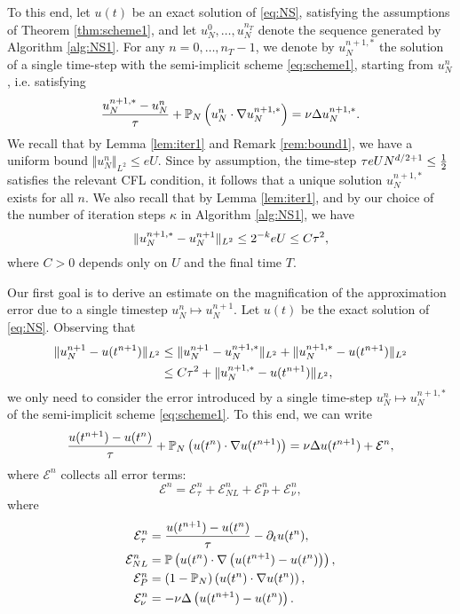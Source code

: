 \documentclass[reqno,a4paper]{amsart}
\begin{document}
To this end, let $u(t)$ be an exact solution of \eqref{eq:NS}, satisfying the assumptions of Theorem \ref{thm:scheme1}, and let $u^0_N, \dots, u^{n_T}_N$ denote the sequence generated by Algorithm \ref{alg:NS1}. For any $n=0,\dots, n_T-1$, we denote by $u^{n+1,\ast}_N$ the solution of a single time-step with the semi-implicit scheme \eqref{eq:scheme1}, starting from $u^{n}_N$, i.e. satisfying
\begin{align} \label{eq:scheme-ast1}
\frac{u^{n+1,\ast}_N-u^n_N}{{\tau}}
+
\mathbb{P}_N\left(
u^n_N \cdot \nabla u^{n+1,\ast}_N
\right)
=
\nu \Delta u^{n+1,\ast}_N.
\end{align}
We recall that by Lemma \ref{lem:iter1} and Remark \ref{rem:bound1}, we have a uniform bound $\Vert u^n_N \Vert_{L^2}\le eU$. Since by assumption, the time-step ${\tau} e U N^{d/2+1}\le \frac1{2}$ satisfies the relevant CFL condition, it follows that a unique solution $u^{n+1,\ast}_N$ exists for all $n$. We also recall that by Lemma \ref{lem:iter1}, and by our choice of the number of iteration steps $\kappa$ in Algorithm \ref{alg:NS1}, we have
\[
\Vert u^{n+1,\ast}_N - u^{n+1}_N \Vert_{L^2}
\le
2^{-k} eU
\le
C {\tau}^2,
\]
where $C>0$ depends only on $U$ and the final time $T$. 

Our first goal is to derive an estimate on the magnification of the approximation error due to a single timestep $u^n_N \mapsto u^{n+1}_N$. Let $u(t)$ be the exact solution of \eqref{eq:NS}. Observing that 
\begin{align} \label{eq:single-dt}
\begin{aligned}
\Vert u^{n+1}_N - u(t^{n+1}) \Vert_{L^2}
&\le
\Vert u^{n+1}_N - u^{n+1,\ast}_N \Vert_{L^2} + \Vert u^{n+1,\ast}_N - u(t^{n+1}) \Vert_{L^2}
\\
&\le
C {\tau}^2 + \Vert u^{n+1,\ast}_N - u(t^{n+1}) \Vert_{L^2},
\end{aligned}
\end{align}
we only need to consider the error introduced by a single time-step $u^n_N \mapsto u^{n+1,\ast}_N$ of the semi-implicit scheme \eqref{eq:scheme1}. To this end, we can write 
\[
\frac{u(t^{n+1}) - u(t^n)}{{\tau}}
+ \mathbb{P}_N\left( u(t^{n})\cdot \nabla u(t^{n+1})\right) = \nu \Delta u(t^{n+1}) + \mathcal{E}^n,
\]
where $\mathcal{E}^n$ collects all error terms:
\[
\mathcal{E}^n 
=
\mathcal{E}^n_{\tau} 
+
\mathcal{E}^n_{NL}
+
\mathcal{E}^n_{P}
+
\mathcal{E}^n_{\nu},
\]
where
\begin{align*}
\mathcal{E}^n_{\tau}
&=
\frac{u(t^{n+1})-u(t^n)}{{\tau}}
-
\partial_t u(t^n),
\\
\mathcal{E}^n_{NL}
&=
\mathbb{P} \left( u(t^n) \cdot \nabla \left(u(t^{n+1}) - u(t^n)\right)\right), 
\\
\mathcal{E}^n_{P}
&=
(1-\mathbb{P}_N)\left( u(t^n)\cdot \nabla u(t^n)\right),
\\
\mathcal{E}^n_{\nu}
&=
-
\nu \Delta \left( u(t^{n+1}) - u(t^n) \right).
\end{align*}
\end{document}
